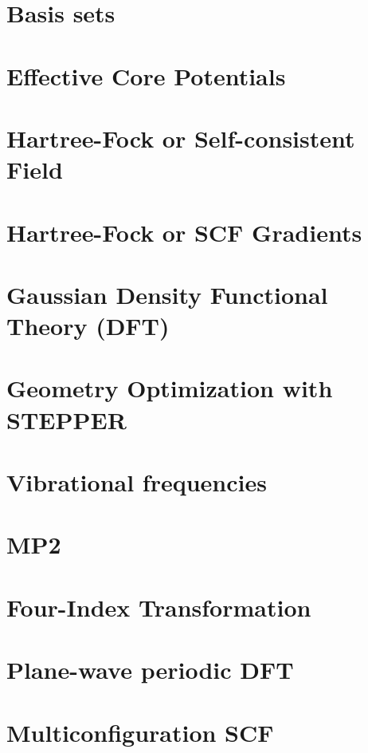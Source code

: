 \chapter{Basis sets}


\chapter{Effective Core Potentials}


\chapter{Hartree-Fock or Self-consistent Field} 


\chapter{Hartree-Fock or SCF Gradients}


\chapter{Gaussian Density Functional Theory (DFT)}


\chapter{Geometry Optimization with STEPPER}


\chapter{Vibrational frequencies}


\chapter{MP2}


\chapter{Four-Index Transformation}


\chapter{Plane-wave periodic DFT}


\chapter{Multiconfiguration SCF}


